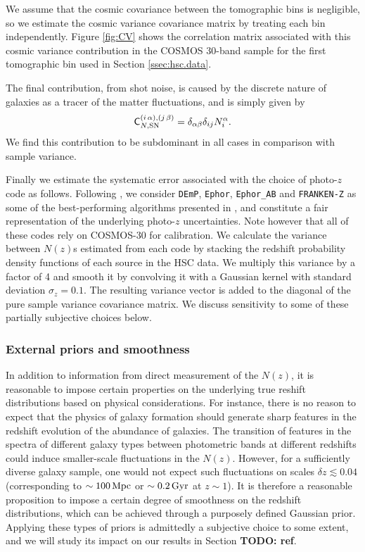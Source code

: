 \documentclass[a4paper,11pt]{article}
\newcommand{\todo}[1]{{\bf TODO: #1}}
\begin{document}
        We assume that the cosmic covariance between the tomographic bins is negligible, so we estimate the cosmic variance covariance matrix by treating each bin independently. Figure \ref{fig:CV} shows the correlation matrix associated with this cosmic variance contribution in the COSMOS 30-band sample for the first tomographic bin used in Section \ref{ssec:hsc.data}.
        
        The final contribution, from shot noise, is caused by the discrete nature of galaxies as a tracer of the matter fluctuations, and is simply given by
        \begin{equation}\label{eq:cov_nz_shot}
          {\sf C}^{(i\,\alpha),(j\,\beta)}_{N,{\rm SN}}=\delta_{\alpha\beta}\delta_{ij}N^\alpha_i.
        \end{equation}
        We find this contribution to be subdominant in all cases in comparison with sample variance.


        Finally we estimate the systematic error associated with the choice of photo-$z$ code as follows. Following \cite{1912.08209}, we consider  {\tt DEmP}, {\tt Ephor}, {\tt Ephor\_AB} and {\tt FRANKEN-Z} as some of the best-performing algorithms presented in \cite{2018PASJ...70S...9T}, and constitute a fair representation of the underlying photo-$z$ uncertainties. Note however that all of these codes rely on COSMOS-30 for calibration. We calculate the variance between $N(z)$s estimated from each code by stacking the redshift probability density functions of each source in the HSC data.  We multiply this variance by a factor of 4 and smooth it by convolving it with a Gaussian kernel with standard deviation $\sigma_z=0.1$. The resulting variance vector is added to the diagonal of the pure sample variance covariance matrix. We discuss sensitivity to some of these partially subjective choices below.

    \subsubsection{External priors and smoothness}\label{sssec:theory.prior.smooth}
      In addition to information from direct measurement of the $N(z)$, it is reasonable to impose certain properties on the underlying true reshift distributions based on physical considerations. For instance, there is no reason to expect that the physics of galaxy formation should generate sharp features in the redshift evolution of the abundance of galaxies. The transition of features in the spectra of different galaxy types between photometric bands at different redshifts could induce smaller-scale fluctuations in the $N(z)$. However, for a sufficiently diverse galaxy sample, one would not expect such fluctuations on scales $\delta z\lesssim0.04$ (corresponding to $\sim100\,{\rm Mpc}$ or $\sim0.2\,{\rm Gyr}$ at $z\sim1$). It is therefore a reasonable proposition to impose a certain degree of smoothness on the redshift distributions, which can be achieved through a purposely defined Gaussian prior. Applying these types of priors is admittedly a subjective choice to some extent, and we will study its impact on our results in Section \todo{ref}.
      
\end{document}

